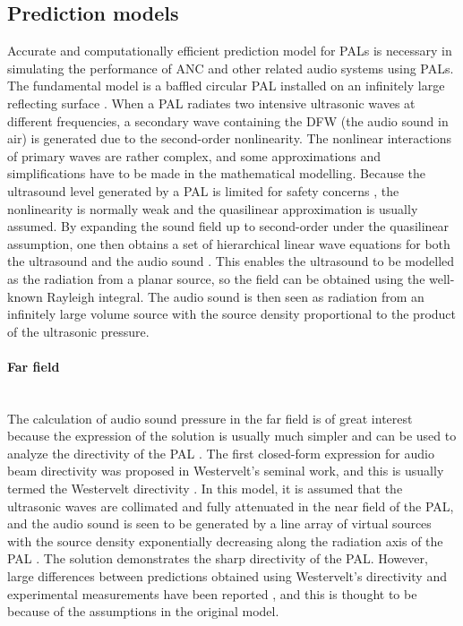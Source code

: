 \subsection{Prediction models}
\label{sec:review_pal_predict}
{
    Accurate and computationally efficient prediction model for PALs is necessary in simulating the performance of ANC and other related audio systems using PALs.
}
The fundamental model is a baffled circular PAL installed on an infinitely large reflecting surface \cite{Cervenka2013NonparaxialModelParametric}. 
When a PAL radiates two intensive ultrasonic waves at different frequencies, a secondary wave containing the DFW (the audio sound in air) is generated due to the {second-order} nonlinearity.
The nonlinear interactions of primary waves are rather complex, and some approximations and simplifications have to be made in the mathematical modelling.
Because the ultrasound level generated by a PAL is limited for safety concerns \cite{Gan2012ReviewParametricAcoustic, Lawton2001DamageHumanHearing, Pompei2002SoundUltrasoundParametric}, the nonlinearity is {normally} weak and the quasilinear approximation is usually assumed.
By expanding the sound field up to second-order under the quasilinear assumption, 
one {then} obtains a set of hierarchical linear wave equations for both the ultrasound and the audio sound \cite{Hamilton2008NonlinearAcoustics, Silva2013DifferencefrequencyGenerationNonlinear}.
{This enables the ultrasound to} be modelled as the radiation from a planar source, so the field can be obtained using the well-known Rayleigh integral.
The audio sound {is then} seen as radiation from an infinitely large volume source with the source density proportional to the product of the {ultrasonic} pressure.

\paragraph{Far field}\mbox{}\\ %
The calculation of audio sound pressure in the far field is of great interest because the expression of the solution is usually much simpler and can be used to analyze the directivity of the PAL \cite{Shi2014OverviewDirectivityControl}.
The first closed-form expression for audio beam directivity was proposed in Westervelt's seminal work, and this is usually termed the Westervelt directivity \cite{Westervelt1963ParametricAcousticArray}.
In this model, it is assumed that the ultrasonic waves are collimated and fully attenuated in the near field of the PAL, and the audio sound is seen to be generated by a line array of virtual sources with the source density exponentially decreasing along the radiation axis of the PAL \cite{Westervelt1963ParametricAcousticArray}. 
{The solution demonstrates the sharp directivity of the PAL.}
However, large differences between predictions obtained using Westervelt's directivity and experimental measurements have been reported \cite{Shi2014OverviewDirectivityControl}, and this is thought to be because {of the} assumptions in the {original} model.

